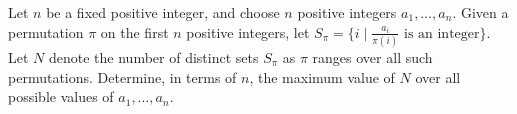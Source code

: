 Let $n$ be a fixed positive integer, and choose $n$ positive integers $a_1, \ldots , a_n$. Given a permutation $\pi$ on the first $n$ positive integers, let $S_{\pi}=\{i\mid \frac{a_i}{\pi(i)} \text{ is an integer}\}$. Let $N$ denote the number of distinct sets $S_{\pi}$ as $\pi$ ranges over all such permutations. Determine, in terms of $n$, the maximum value of $N$ over all possible values of $a_1, \ldots , a_n$.

